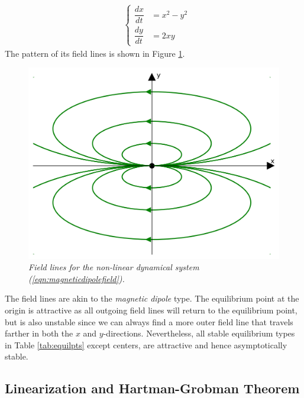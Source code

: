 \begin{align}
&\left\{\begin{alignedat}{1}
\dfrac{dx}{dt} &= x^2 - y^2 \\
\dfrac{dy}{dt} &= 2xy
\end{alignedat}\right. 
\label{eqn:magneticdipolefield}
\end{align}
The pattern of its field lines is shown in Figure \ref{fig:magneticdipolefield}. 
\begin{figure}
    \centering
    \includegraphics[scale=0.6]{graphics/dipolefield.png}
    \caption{\textit{Field lines for the non-linear dynamical system (\ref{eqn:magneticdipolefield}).}}
    \label{fig:magneticdipolefield}
\end{figure}
The field lines are akin to the \textit{magnetic dipole} type. The equilibrium point at the origin is attractive as all outgoing field lines will return to the equilibrium point, but is also unstable since we can always find a more outer field line that travels farther in both the $x$ and $y$-directions.\footnotemark{} Nevertheless, all stable equilibrium types in Table \ref{tab:equilpts} except centers, are attractive and hence asymptotically stable.

\subsection{Linearization and Hartman-Grobman Theorem}
\label{subsection:HGthm}

